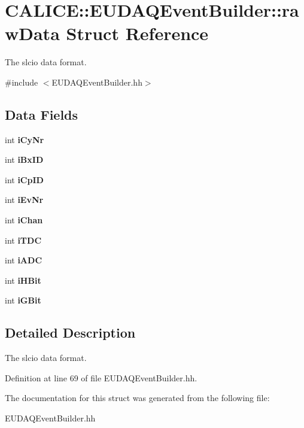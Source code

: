 \section{CALICE::EUDAQEventBuilder::rawData Struct Reference}
\label{structCALICE_1_1EUDAQEventBuilder_1_1rawData}


The slcio data format.  


{\ttfamily \#include $<$EUDAQEventBuilder.hh$>$}\subsection*{Data Fields}
\begin{DoxyCompactItemize}
\item 
int {\bfseries iCyNr}\label{structCALICE_1_1EUDAQEventBuilder_1_1rawData_a006628d4355eff92eedfa9a6cd750c1f}

\item 
int {\bfseries iBxID}\label{structCALICE_1_1EUDAQEventBuilder_1_1rawData_a2212434bb5aaf722fb96d9c40c7b4d51}

\item 
int {\bfseries iCpID}\label{structCALICE_1_1EUDAQEventBuilder_1_1rawData_aaf2e66f34599ecd9a7ec6eba19e7946e}

\item 
int {\bfseries iEvNr}\label{structCALICE_1_1EUDAQEventBuilder_1_1rawData_ad098fe7746808f4d3401d1c2a40f646f}

\item 
int {\bfseries iChan}\label{structCALICE_1_1EUDAQEventBuilder_1_1rawData_a622d82b2d99fe835f2e587d3f7e20724}

\item 
int {\bfseries iTDC}\label{structCALICE_1_1EUDAQEventBuilder_1_1rawData_abad5c342509389ba287acc4e5a326276}

\item 
int {\bfseries iADC}\label{structCALICE_1_1EUDAQEventBuilder_1_1rawData_ad2301901a9a551c242b2d25e22654b4d}

\item 
int {\bfseries iHBit}\label{structCALICE_1_1EUDAQEventBuilder_1_1rawData_ae4b96f164ea2de6026eb4c1273da263a}

\item 
int {\bfseries iGBit}\label{structCALICE_1_1EUDAQEventBuilder_1_1rawData_a3f8979de8030b4108bd673971db3104f}

\end{DoxyCompactItemize}


\subsection{Detailed Description}
The slcio data format. 

Definition at line 69 of file EUDAQEventBuilder.hh.

The documentation for this struct was generated from the following file:\begin{DoxyCompactItemize}
\item 
EUDAQEventBuilder.hh\end{DoxyCompactItemize}
